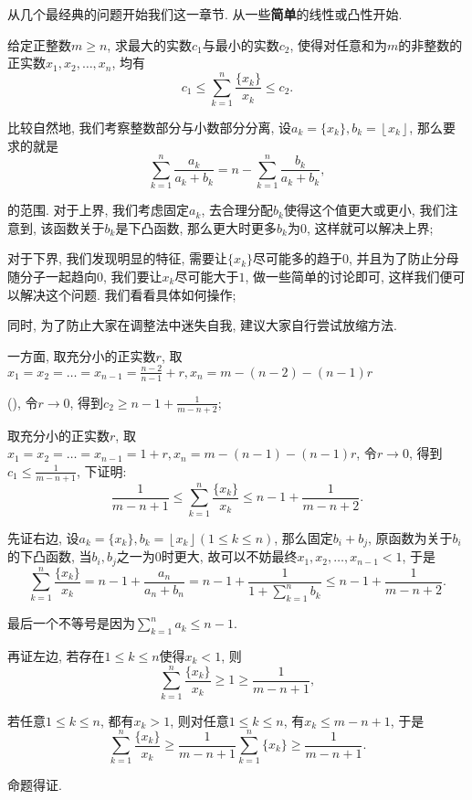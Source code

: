 \documentclass[lang=cn,12pt,thmcnt=section]{elegantbook}
\newcommand{\fl}[1]{\left\lfloor #1\right\rfloor}
\renewcommand{\note}[1]{({\kaishu\dashuline{#1}})}
\begin{document}
从几个最经典的问题开始我们这一章节. 从一些\textbf{简单}的线性或凸性开始.

\begin{example}
给定正整数$m\ge n$, 求最大的实数$c_1$与最小的实数$c_2$, 使得对任意和为$m$的非整数的正实数$x_1,x_2,\dots{},x_n$, 均有
\[
c_1\le \sum_{k=1}^n \frac{\{x_k\}}{x_k}\le c_2.
\]
\end{example}

\begin{analysis}
比较自然地, 我们考察整数部分与小数部分分离, 设$a_k=\{x_k\},b_k=\fl{x_k}$, 那么要求的就是
\[
\sum_{k=1}^n \frac{a_k}{a_k+b_k}=n-\sum_{k=1}^n \frac{b_k}{a_k+b_k},
\]

的范围. 对于上界, 我们考虑固定$a_k$, 去合理分配$b_k$使得这个值更大或更小, 我们注意到, 该函数关于$b_k$是下凸函数, 那么更大时更多$b_k$为$0$, 这样就可以解决上界; 

对于下界, 我们发现明显的特征, 需要让$\{x_k\}$尽可能多的趋于$0$, 并且为了防止分母随分子一起趋向$0$, 我们要让$x_k$尽可能大于$1$, 做一些简单的讨论即可, 这样我们便可以解决这个问题. 我们看看具体如何操作; 

同时, 为了防止大家在调整法中迷失自我, 建议大家自行尝试放缩方法.
\end{analysis}

\begin{solution}
一方面, 取充分小的正实数$r$, 取$x_{1}=x_{2}=\dots{}=x_{n-1}=\frac{n-2}{n-1}+r, x_{n}=m-(n-2)-(n-1)r$

\note{其实只需前$n-1$个小于$1$且和为$n-2$}, 令$r\to 0$, 得到$c_2\ge n-1+\frac{1}{m-n+2}$; 

取充分小的正实数$r$, 取$x_{1}=x_{2}=\dots{}=x_{n-1}=1+r, x_{n}=m-(n-1)-(n-1)r$, 令$r\to 0$, 得到$c_1\le \frac{1}{m-n+1}$, 下证明: 
\[
\frac{1}{m-n+1}\le \sum_{k=1}^n \frac{\{x_k\}}{x_k}\le n-1+\frac{1}{m-n+2}.
\]

先证右边, 设$a_k=\{x_k\},b_k=\fl{x_k}(1\le k\le n)$, 那么固定$b_i+b_j$, 原函数为关于$b_i$的下凸函数, 当$b_i,b_j$之一为$0$时更大, 故可以不妨最终$x_1,x_2,\dots{},x_{n-1}<1$, 于是
\[
 \sum_{k=1}^n \frac{\{x_k\}}{x_k}= n-1+\frac{a_n}{a_n+b_n}=n-1+\frac{1}{1+\sum_{k=1}^n b_k}\le n-1+\frac{1}{m-n+2}.
\]

最后一个不等号是因为$\sum\limits_{k=1}^n a_k\le n-1$.

再证左边, 若存在$1\le k\le n$使得$x_k<1$, 则
\[
\sum_{k=1}^n \frac{\{x_k\}}{x_k}\ge 1\ge \frac{1}{m-n+1},
\]

若任意$1\le k\le n$, 都有$x_k>1$, 则对任意$1\le k\le n$, 有$x_k\le m-n+1$, 于是
\[
\sum_{k=1}^n \frac{\{x_k\}}{x_k}\ge \frac{1}{m-n+1}\sum_{k=1}^n \{x_k\}\ge \frac{1}{m-n+1}.
\]

命题得证.
\end{solution}
\end{document}
